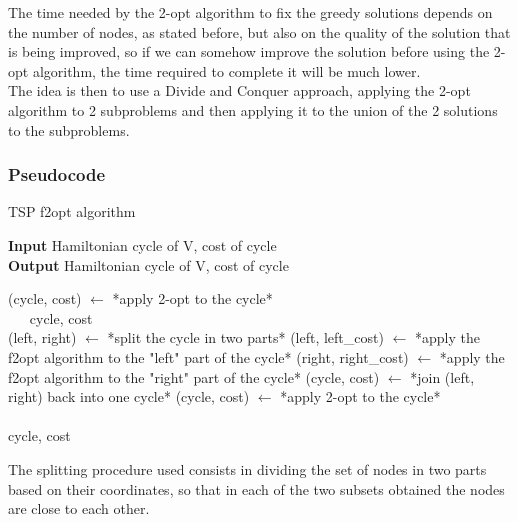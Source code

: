 The time needed by the 2-opt algorithm to fix the greedy solutions depends on the number of nodes, as stated before, but also on the quality of the solution that is being improved, so if we can somehow improve the solution before using the 2-opt algorithm, the time required to complete it will be much lower.\\

The idea is then to use a Divide and Conquer approach, applying the 2-opt algorithm to 2 subproblems and then applying it to the union of the 2 solutions to the subproblems.\\

\newpage

\subsubsection{Pseudocode}
\begin{algorithm}
    \caption{TSP f2opt algorithm}

    \textbf{Input} Hamiltonian cycle of V, cost of cycle\\
    \textbf{Output} Hamiltonian cycle of V, cost of cycle\\
    \begin{algorithmic}

            \State (cycle, cost) $\gets$ *apply 2-opt to the cycle*\\
            $\quad\;\;$\Return cycle, cost
        \EndIf\\

            \State (left, right) $\gets$ *split the cycle in two parts*
            \State (left, left\_cost) $\gets$ *apply the f2opt algorithm to the "left" part of the cycle*
            \State (right, right\_cost) $\gets$ *apply the f2opt algorithm to the "right" part of the cycle*
            \State (cycle, cost) $\gets$ *join (left, right) back into one cycle*
            \State (cycle, cost) $\gets$ *apply 2-opt to the cycle*
        \EndWhile\\\\

        \Return cycle, cost

    \end{algorithmic}
\end{algorithm}

The splitting procedure used consists in dividing the set of nodes in two parts based on their coordinates, so that in each of the two subsets obtained the nodes are close to each other.

